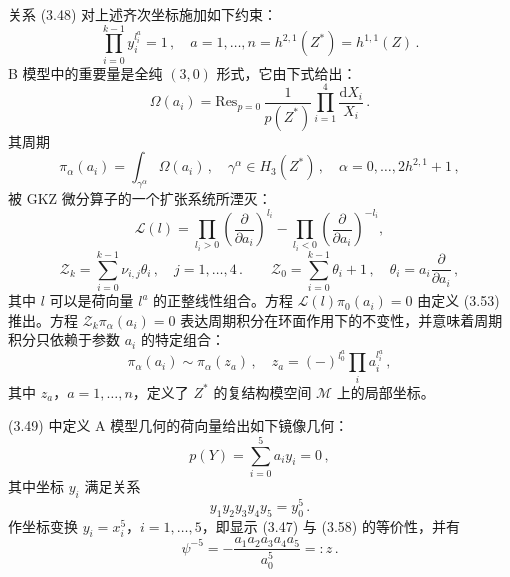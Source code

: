 关系 (3.48) 对上述齐次坐标施加如下约束：
\begin{equation}\tag{3.52}
\prod_{i=0}^{k-1}y_i^{l_i^a}=1\,,\quad a=1,\dots,n=h^{2,1}(Z^*)=h^{1,1}(Z)\,.
\end{equation}
B 模型中的重要量是全纯 $(3,0)$ 形式，它由下式给出：
\begin{equation}\tag{3.53}
\Omega(a_i)=\mathrm{Res}_{p=0}\,\frac{1}{p(Z^*)}\prod_{i=1}^{4}\frac{\mathrm{d}X_i}{X_i}\,.
\end{equation}
其周期
\begin{equation}\tag{3.54}
\pi_\alpha(a_i)=\int_{\gamma^\alpha}\Omega(a_i)\,,\quad \gamma^\alpha\in H_3(Z^*)\,,\quad \alpha=0,\dots,2h^{2,1}+1\,,
\end{equation}
被 GKZ \cite{ref68} 微分算子的一个扩张系统所湮灭：
\begin{equation}\tag{3.55}
\mathcal{L}(l)=\prod_{l_i>0}\left(\frac{\partial}{\partial a_i}\right)^{l_i}-\prod_{l_i<0}\left(\frac{\partial}{\partial a_i}\right)^{-l_i},
\end{equation}
\begin{equation}\tag{3.56}
\mathcal{Z}_k=\sum_{i=0}^{k-1}\nu_{i,j}\theta_i\,,\quad j=1,\dots,4\,.\qquad
\mathcal{Z}_0=\sum_{i=0}^{k-1}\theta_i+1\,,\quad \theta_i=a_i\frac{\partial}{\partial a_i}\,,
\end{equation}
其中 $l$ 可以是荷向量 $l^a$ 的正整线性组合。方程 $\mathcal{L}(l)\pi_0(a_i)=0$ 由定义 (3.53) 推出。方程 $\mathcal{Z}_k\pi_\alpha(a_i)=0$ 表达周期积分在环面作用下的不变性，并意味着周期积分只依赖于参数 $a_i$ 的特定组合：
\begin{equation}\tag{3.57}
\pi_\alpha(a_i)\sim\pi_\alpha(z_a)\,,\quad z_a=(-)^{l_0^a}\prod_i a_i^{l_i^a}\,,
\end{equation}
其中 $z_a$，$a=1,\dots,n$，定义了 $Z^*$ 的复结构模空间 $\mathcal{M}$ 上的局部坐标。

(3.49) 中定义 A 模型几何的荷向量给出如下镜像几何：
\begin{equation}\tag{3.58}
p(Y)=\sum_{i=0}^{5}a_iy_i=0\,,
\end{equation}
其中坐标 $y_i$ 满足关系
\begin{equation}\tag{3.59}
y_1y_2y_3y_4y_5=y_0^5\,.
\end{equation}
作坐标变换 $y_i=x_i^5$，$i=1,\dots,5$，即显示 (3.47) 与 (3.58) 的等价性，并有
\begin{equation}\tag{3.60}
\psi^{-5}=-\frac{a_1a_2a_3a_4a_5}{a_0^5}=:z\,.
\end{equation}


